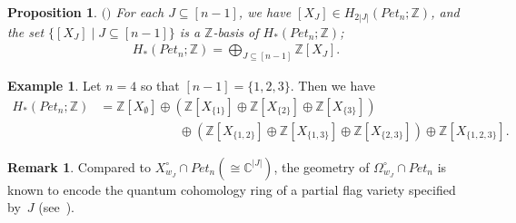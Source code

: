 \documentclass[11pt]{article}
\newtheorem{prop}[theo]{Proposition}
\theoremstyle{definition}
\newtheorem{exam}[theo]{Example}
\newtheorem{rema}[theo]{Remark}
\numberwithin{equation}{section}
\numberwithin{equation}{section}
\begin{document}
\begin{prop}\label{prop: homology basis}
$($\cite{Peterson,ty}$)$
For each $J\subseteq [n-1]$, we have $[X_J]\in H_{2|J|}(Pet_{n};{\mathbb Z})$, and the set
$\{ [X_J] \mid J\subseteq [n-1]\}$ is a ${\mathbb Z}$-basis of $H_*(Pet_{n};{\mathbb Z})$; 
\begin{align*}
 H_*(Pet_{n};{\mathbb Z}) = \bigoplus_{J\subseteq [n-1]} {\mathbb Z} [X_J] .
\end{align*}
\end{prop}

\begin{exam}\label{ex: homology basis}
{\rm 
Let $n=4$ so that $[n-1]=\{1,2,3\}$. Then we have 
\begin{align*}
H_*(Pet_{n};{\mathbb Z}) &= {\mathbb Z} [X_{\emptyset}]\oplus({\mathbb Z} [X_{\{1\}}]\oplus{\mathbb Z} [X_{\{2\}}]\oplus{\mathbb Z} [X_{\{3\}}])\\
&\hspace{75pt}\oplus({\mathbb Z} [X_{\{1,2\}}]\oplus{\mathbb Z} [X_{\{1,3\}}]\oplus{\mathbb Z} [X_{\{2,3\}}])\oplus{\mathbb Z} [X_{\{1,2,3\}}].
\end{align*}}
\end{exam}

\begin{rema}
Compared to $X^{\circ}_{w_J}\cap Pet_{n}(\cong {\mathbb C}^{|J|})$, the geometry of $\Omega^{\circ}_{w_J}\cap Pet_{n}$ is known to encode the quantum cohomology ring of a partial flag variety specified by~$J$ (see~\cite{Peterson, Rietsch06}).
\end{rema}
\end{document}
